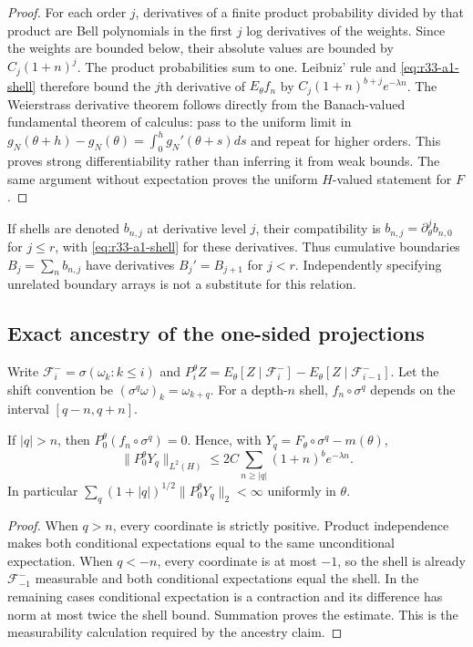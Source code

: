 \begin{proof}
For each order $j$, derivatives of a finite product probability divided by that product are Bell polynomials in the first $j$ log derivatives of the weights. Since the weights are bounded below, their absolute values are bounded by $C_j(1+n)^j$. The product probabilities sum to one. Leibniz' rule and \eqref{eq:r33-a1-shell} therefore bound the $j$th derivative of $E_\theta f_n$ by $C_j(1+n)^{b+j}e^{-\lambda n}$. The Weierstrass derivative theorem follows directly from the Banach-valued fundamental theorem of calculus: pass to the uniform limit in
$g_N(\theta+h)-g_N(\theta)=\int_0^h g_N'(\theta+s)ds$ and repeat for higher orders. This proves strong differentiability rather than inferring it from weak bounds. The same argument without expectation proves the uniform $H$-valued statement for $F$.
\end{proof}

If shells are denoted $b_{n,j}$ at derivative level $j$, their compatibility is $b_{n,j}=\partial_\theta^j b_{n,0}$ for $j\le r$, with \eqref{eq:r33-a1-shell} for these derivatives. Thus cumulative boundaries $B_j=\sum_n b_{n,j}$ have derivatives $B_j'=B_{j+1}$ for $j<r$. Independently specifying unrelated boundary arrays is not a substitute for this relation.

\subsection{Exact ancestry of the one-sided projections}
Write $\mathcal F_i^- =\sigma(\omega_k:k\le i)$ and $P_i^\theta Z=E_\theta[Z\mid\mathcal F_i^-]-E_\theta[Z\mid\mathcal F_{i-1}^-]$. Let the shift convention be $(\sigma^q\omega)_k=\omega_{k+q}$. For a depth-$n$ shell, $f_n\circ\sigma^q$ depends on the interval $[q-n,q+n]$.

\begin{lemma}
\label{lem:r33-a1-ancestry}
If $|q|>n$, then $P_0^\theta(f_n\circ\sigma^q)=0$. Hence, with $Y_q=F_\theta\circ\sigma^q-m(\theta)$,
\[
 \|P_0^\theta Y_q\|_{L^2(H)}
 \le 2C\sum_{n\ge|q|}(1+n)^b e^{-\lambda n}.
\]
In particular $\sum_q(1+|q|)^{1/2}\|P_0^\theta Y_q\|_2<\infty$ uniformly in $\theta$.
\end{lemma}

\begin{proof}
When $q>n$, every coordinate is strictly positive. Product independence makes both conditional expectations equal to the same unconditional expectation. When $q<-n$, every coordinate is at most $-1$, so the shell is already $\mathcal F_{-1}^-$ measurable and both conditional expectations equal the shell. In the remaining cases conditional expectation is a contraction and its difference has norm at most twice the shell bound. Summation proves the estimate. This is the measurability calculation required by the ancestry claim.
\end{proof}

